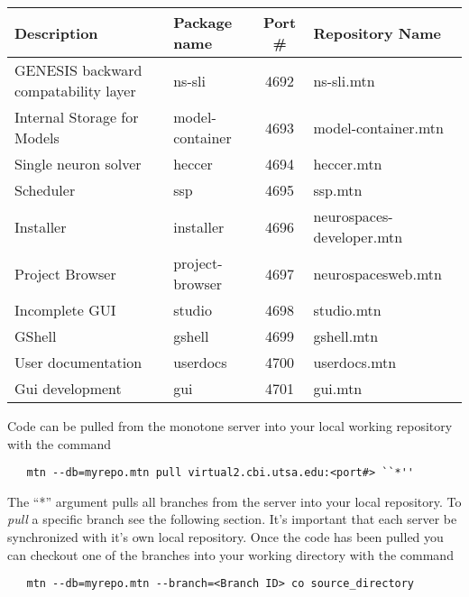 \documentclass[12pt]{article}
\begin{document}
\vspace{3mm}
\begin{footnotesize}
\begin{centering}
\begin{tabular}{| l | l | c | l |}
\hline
{\bf Description}                                               & {\bf Package name}   & {\bf Port \#} & {\bf Repository Name} \\ \hline
GENESIS backward compatability layer    & ns-sli           & 4692           & ns-sli.mtn \\ \hline
Internal Storage for Models                           & model-container        & 4693           & model-container.mtn \\ \hline
Single neuron solver                                      & heccer 	                        & 4694           & heccer.mtn \\ \hline
Scheduler                                                         & ssp                                & 4695           & ssp.mtn \\ \hline
Installer                                                             & installer                        & 4696           & neurospaces-developer.mtn \\ \hline
Project Browser                                               & project-browser          & 4697           & neurospacesweb.mtn \\ \hline
Incomplete GUI 	                                      & studio                            & 4698           & studio.mtn \\ \hline
GShell 	                                                         & gshell                            & 4699          & gshell.mtn \\ \hline
User documentation                                       & userdocs                      & 4700          & userdocs.mtn \\ \hline
Gui development                                             & gui                                 & 4701          & gui.mtn \\ \hline
\end{tabular}
\end{centering}
\end{footnotesize}

\noindent Code can be pulled from the monotone server into your local working repository with the command
\begin{verbatim}
   mtn --db=myrepo.mtn pull virtual2.cbi.utsa.edu:<port#> ``*''
\end{verbatim}
The ``*'' argument pulls all branches from the server into your local repository. To {\it pull} a specific branch see the following section. It's important that each server be synchronized with it's own local repository. Once the code has been pulled you can checkout one of the branches into your working directory with the command
\begin{verbatim}
   mtn --db=myrepo.mtn --branch=<Branch ID> co source_directory 
\end{verbatim}
\end{document}
